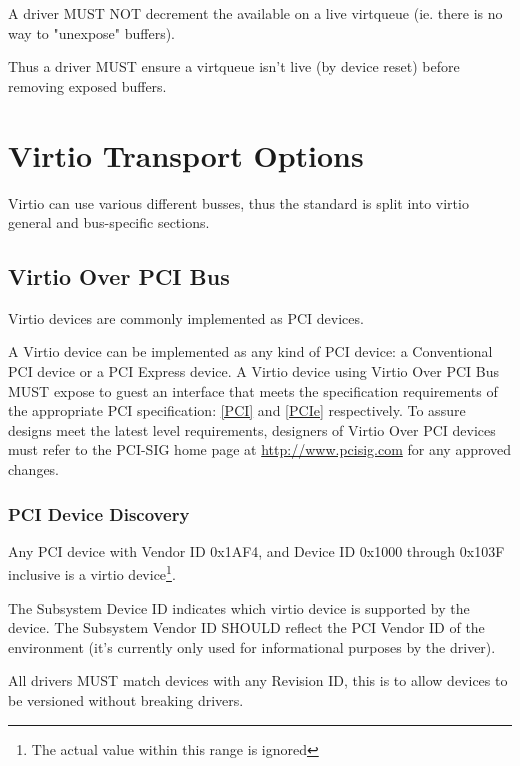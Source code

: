 A driver MUST NOT decrement the available  on a live virtqueue (ie.
there is no way to "unexpose" buffers).

Thus a driver MUST ensure a virtqueue isn't live (by device reset) before removing exposed buffers.

\chapter{Virtio Transport Options}\label{sec:Virtio Transport Options}

Virtio can use various different busses, thus the standard is split
into virtio general and bus-specific sections.

\section{Virtio Over PCI Bus}\label{sec:Virtio Transport Options / Virtio Over PCI Bus}

Virtio devices are commonly implemented as PCI devices.

A Virtio device can be implemented as any kind of PCI device:
a Conventional PCI device or a PCI Express
device.  A Virtio device using Virtio Over PCI Bus MUST expose to
guest an interface that meets the specification requirements of
the appropriate PCI specification: \hyperref[intro:PCI]{[PCI]}
and \hyperref[intro:PCIe]{[PCIe]}
respectively.  To assure designs meet the latest level
requirements, designers of Virtio Over PCI devices must refer to
the PCI-SIG home page at \url{http://www.pcisig.com} for any
approved changes.

\subsection{PCI Device Discovery}\label{sec:Virtio Transport Options / Virtio Over PCI Bus / PCI Device Discovery}

Any PCI device with Vendor ID 0x1AF4, and Device ID 0x1000 through
0x103F inclusive is a virtio device\footnote{The actual value within this range is ignored
}.

The Subsystem Device ID indicates which virtio device is
supported by the device. The Subsystem Vendor ID SHOULD reflect
the PCI Vendor ID of the environment (it's currently only used
for informational purposes by the driver).

All drivers MUST match devices with any Revision ID, this
is to allow devices to be versioned without breaking drivers.

